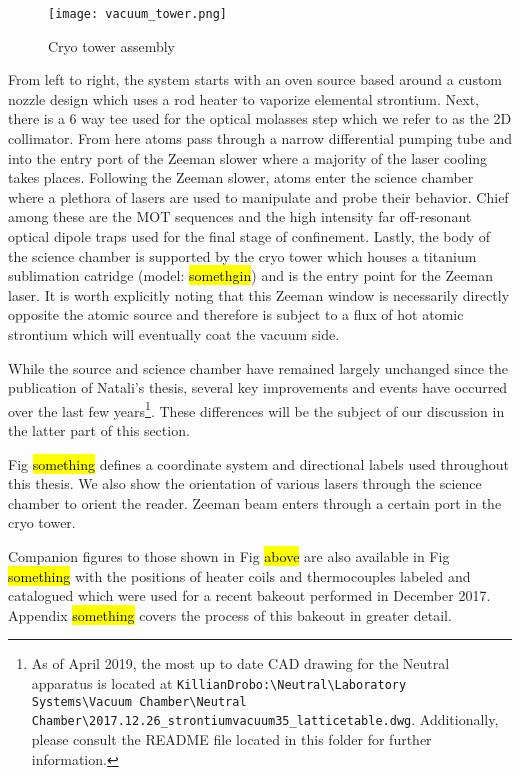 	\begin{figure} 
		\centerline{
		\texttt{[image: vacuum\_tower.png]}}
		\caption{Cryo tower assembly}
		\label{fig:cryoTower}
	\end{figure}
From left to right, the system starts with an oven source based around a custom nozzle design which uses a rod heater to vaporize elemental strontium.
Next, there is a 6 way tee used for the optical molasses step which we refer to as the 2D collimator. 
From here atoms pass through a narrow differential pumping tube and into the entry port of the Zeeman slower where a majority of the laser cooling takes places. 
Following the Zeeman slower, atoms enter the science chamber where a plethora of lasers are used to manipulate and probe their behavior.
Chief among these are the MOT sequences and the high intensity far off-resonant optical dipole traps used for the final stage of confinement.
Lastly, the body of the science chamber is supported by the cryo tower which houses a titanium sublimation catridge (model: \hl{somethgin}) and is the entry point for the Zeeman laser.
It is worth explicitly noting that this Zeeman window is necessarily directly opposite the atomic source and therefore is subject to a flux of hot atomic strontium which will eventually coat the vacuum side.

While the source and science chamber have remained largely unchanged since the publication of Natali's thesis, several key improvements and events have occurred over the last few years\footnote{As of April 2019, the most up to date CAD drawing for the Neutral apparatus is located at \texttt{KillianDrobo:\textbackslash Neutral\textbackslash Laboratory Systems\textbackslash Vacuum Chamber\textbackslash Neutral Chamber\textbackslash 2017.12.26\_strontiumvacuum35\_latticetable.dwg}. Additionally, please consult the README file located in this folder for further information.}.
These differences will be the subject of our discussion in the latter part of this section.


Fig \hl{something} defines a coordinate system and directional labels used throughout this thesis. 
We also show the orientation of various lasers through the science chamber to orient the reader.
Zeeman beam enters through a certain port in the cryo tower.

Companion figures to those shown in Fig \hl{above} are also available in Fig \hl{something} with the positions of heater coils and thermocouples labeled and catalogued which were used for a recent bakeout performed in December 2017. 
Appendix \hl{something} covers the process of this bakeout in greater detail.

